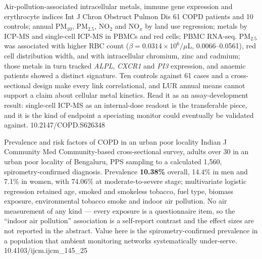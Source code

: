 \documentclass[10pt]{article}
\begin{document}

{Air-pollution-associated intracellular metals, immune gene expression and erythrocyte
indices}
{Int J Chron Obstruct Pulmon Dis}
{61 COPD patients and 10 controls; annual PM$_{10}$, PM$_{2.5}$, NO$_2$ and NO$_x$ by land
use regression; metals by ICP-MS and single-cell ICP-MS in PBMCs and red cells; PBMC
RNA-seq. PM$_{2.5}$ was associated with higher RBC count ($\beta=0.0314\times10^6/\mu$L,
0.0066--0.0561), red cell distribution width, and with intracellular chromium, zinc and
cadmium; those metals in turn tracked \textit{ALPL}, \textit{CXCR1} and \textit{PI3}
expression, and anaemic patients showed a distinct signature. Ten controls against 61 cases
and a cross-sectional design make every link correlational, and LUR annual means cannot
support a claim about cellular metal kinetics. Read it as an assay-development result:
single-cell ICP-MS as an internal-dose readout is the transferable piece, and it is the
kind of endpoint a speciating monitor could eventually be validated against.}
{10.2147/COPD.S626348}

{Prevalence and risk factors of COPD in an urban poor locality}
{Indian J Community Med}
{Community-based cross-sectional survey, adults over 30 in an urban poor locality of
Bengaluru, PPS sampling to a calculated 1{,}560, spirometry-confirmed diagnosis.
Prevalence \textbf{10.38\%} overall, 14.4\% in men and 7.1\% in women, with 74.06\% at
moderate-to-severe stage; multivariate logistic regression retained age, smoked and
smokeless tobacco, fuel type, biomass exposure, environmental tobacco smoke and indoor air
pollution. No air measurement of any kind --- every exposure is a questionnaire item, so
the ``indoor air pollution'' association is a self-report contrast and the effect sizes are
not reported in the abstract. Value here is the spirometry-confirmed prevalence in a
population that ambient monitoring networks systematically under-serve.}
{10.4103/ijcm.ijcm_145_25}

\end{document}

